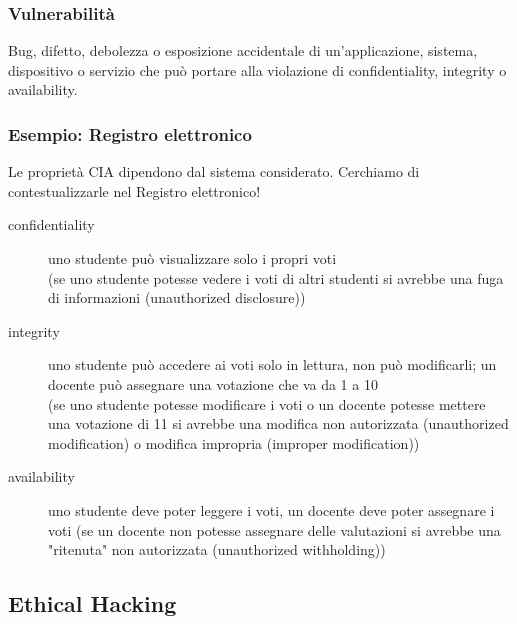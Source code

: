\documentclass{beamer}
\begin{document}
\subsubsection*{Vulnerabilità}
\begin{frame}{\insertsubsection}{\insertsubsubsection}
\begin{block}{\insertsubsubsection}
Bug, difetto, debolezza o esposizione accidentale di un'applicazione, sistema,
dispositivo o servizio che può portare alla violazione di
\alert{confidentiality}, \alert{integrity} o \alert{availability}.
\end{block}
\end{frame}

\subsubsection*{Esempio: Registro elettronico}
\begin{frame}[allowframebreaks]{\insertsubsection}{\insertsubsubsection}
Le proprietà CIA dipendono dal sistema considerato. Cerchiamo di
contestualizzarle nel Registro elettronico!
\begin{description}
\item[confidentiality] uno studente può visualizzare solo i propri voti \\
(se uno studente potesse vedere i voti di altri studenti si avrebbe una
\alert{fuga di informazioni} (\alert{unauthorized disclosure}))
\item[integrity] uno studente può accedere ai voti solo in lettura, non
può modificarli; un docente può assegnare una votazione che va da 1 a 10 \\
(se uno studente potesse modificare i voti o un docente potesse mettere una
votazione di 11 si avrebbe una \alert{modifica non autorizzata}
(\alert{unauthorized modification}) o \alert{modifica impropria}
(\alert{improper modification}))
\item[availability] uno studente deve poter leggere i voti, un docente deve
poter assegnare i voti (se un docente non potesse assegnare delle valutazioni si
avrebbe una \alert{"ritenuta" non autorizzata} (\alert{unauthorized withholding}))
\end{description}
\end{frame}

\subsection{Ethical Hacking}
\begin{frame}{\insertsubsection}
\end{frame}
\end{document}
